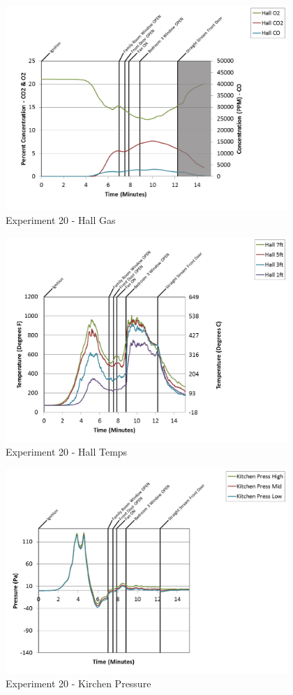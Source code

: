 \documentclass{article}
\begin{document}
\begin{appendices}
\clearpage

\begin{figure}[h!]
	\centering
	\includegraphics[height=3.05in]{0_Images/Results_Charts/Exp_20_Charts/HallGas.png}
	\caption{Experiment 20 - Hall Gas}
\end{figure}


\begin{figure}[h!]
	\centering
	\includegraphics[height=3.05in]{0_Images/Results_Charts/Exp_20_Charts/HallTemps.png}
	\caption{Experiment 20 - Hall Temps}
\end{figure}

\clearpage

\begin{figure}[h!]
	\centering
	\includegraphics[height=3.05in]{0_Images/Results_Charts/Exp_20_Charts/KirchenPressure.png}
	\caption{Experiment 20 - Kirchen Pressure}
\end{figure}



\end{appendices}
\end{document}
